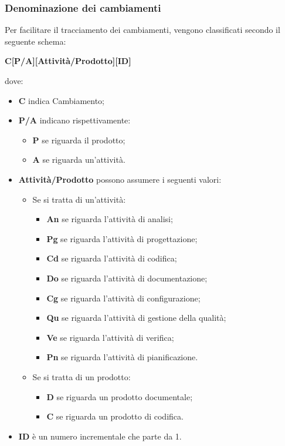 \subsubsection{Denominazione dei cambiamenti}\label{NomeCambiamenti}
Per facilitare il tracciamento dei cambiamenti, vengono classificati secondo il seguente schema:
\begin{center}
	\textbf{C[P/A][Attività/Prodotto][ID]}
\end{center} 
dove:
\begin{itemize}
	\item \textbf{C} indica Cambiamento;
	\item \textbf{P/A} indicano rispettivamente:
	\begin{itemize}
		\item \textbf{P} se riguarda il prodotto;
		\item \textbf{A} se riguarda un'attività.
	\end{itemize}
	\item \textbf{Attività/Prodotto} possono assumere i seguenti valori:
	\begin{itemize}
		\item Se si tratta di un'attività:
		\begin{itemize}
			\item \textbf{An} se riguarda l'attività di analisi;
			\item \textbf{Pg} se riguarda l'attività di progettazione;
			\item \textbf{Cd} se riguarda l'attività di codifica;
			\item \textbf{Do} se riguarda l'attività di documentazione;
			\item \textbf{Cg} se riguarda l'attività di configurazione;
			\item \textbf{Qu} se riguarda l'attività di gestione della qualità;
			\item \textbf{Ve} se riguarda l'attività di verifica;
			\item \textbf{Pn} se riguarda l'attività di pianificazione.
		\end{itemize}
		\item Se si tratta di un prodotto:
		\begin{itemize}
			\item \textbf{D} se riguarda un prodotto documentale;
			\item \textbf{C} se riguarda un prodotto di codifica.
		\end{itemize}
	\end{itemize}
	\item \textbf{ID} è un numero incrementale che parte da 1.
\end{itemize}
